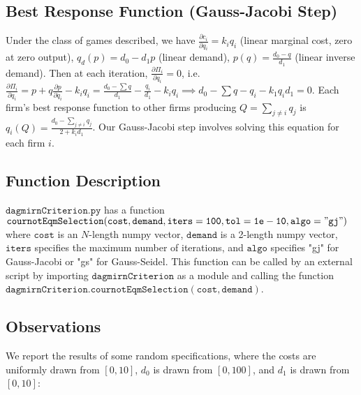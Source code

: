 \documentclass[11pt]{article}
\begin{document}
\subsection*{Best Response Function (Gauss-Jacobi Step)}
Under the class of games described, we have $\frac{\partial c_i}{\partial q_i} = k_i q_i$ (linear marginal cost, zero at zero output), $q_d(p) = d_0 - d_1 p$ (linear demand), $p(q) = \frac{d_0 - q}{d_1}$ (linear inverse demand). Then at each iteration, $\frac{\partial \Pi_i}{\partial q_i} = 0$, i.e. $\frac{\partial \Pi_i}{\partial q_i} = p + q \frac{\partial p}{\partial q_i}-k_i q_i = \frac{d_0 - \sum q}{d_1} - \frac{q_i}{d_1} - k_i q_i \implies d_0 - \sum q - q_i - k_1 q_i d_1 = 0$.
Each firm's best response function to other firms producing $Q = \sum_{j \neq i} q_j$ is $q_i(Q) = \frac{d_0 - \sum_{j \neq i} q_j}{2 + k_i d_1}$. Our Gauss-Jacobi step involves solving this equation for each firm $i$.
\subsection*{Function Description}
$\mathtt{dagmirnCriterion.py}$ has a function $\mathtt{cournotEqmSelection(cost, demand, iters=100, tol=1e-10, algo="gj")}$ where $\mathtt{cost}$ is an $N$-length numpy vector, $\mathtt{demand}$ is a 2-length numpy vector, $\mathtt{iters}$ specifies the maximum number of iterations, and $\mathtt{algo}$ specifies "gj" for Gauss-Jacobi or "gs" for Gauss-Seidel. This function can be called by an external script by importing $\mathtt{dagmirnCriterion}$ as a module and calling the function\\ $\mathtt{dagmirnCriterion.cournotEqmSelection(cost,demand)}$.
\subsection*{Observations}
We report the results of some random specifications, where the costs are uniformly drawn from $[0,10]$, $d_0$ is drawn from $[0,100]$, and $d_1$ is drawn from $[0,10]$:
\end{document}
